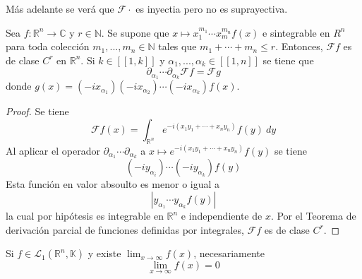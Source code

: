 \documentclass[12pt]{report}
\theoremstyle{largebreak}
\renewcommand{\leq}{\ensuremath{\leqslant}}
\newcommand\abs[1]{\ensuremath{\left|#1\right|}}
\newcommand\cf[3]{\ensuremath{#1:#2\rightarrow#3}}
\newcommand{\natint}[1]{\ensuremath{\left[\!\left[#1\right]\!\right]}}
\newcommand{\fou}[1]{\ensuremath{\mathcal{F}#1}}
\begin{document}
    \begin{obs}
        Más adelante se verá que $\fou{\cdot}$ es inyectia pero no es suprayectiva.
    \end{obs}

    \begin{propo}
        Sea $\cf{f}{\mathbb{R}^n}{\mathbb{C}}$ y $r\in\mathbb{N}$. Se supone que $x\mapsto x_1^{m_1}\cdots x_m^{m_n}f(x)$ e sintegrable en $R^n$ para toda colección $m_1,...,m_n\in\mathbb{N}$ tales que $m_1+\cdots+m_n\leq r$. Entonces, $\fou{f}$ es de clase $C^r$ en $\mathbb{R}^n$. Si $k\in\natint{1,k}$ y $\alpha_1,...,\alpha_k\in\natint{1,n}$ se tiene que
        \begin{equation*}
            \partial_{\alpha_1}\cdots\partial_{\alpha_k}\fou{f}=\fou{g}
        \end{equation*}
        donde $g(x)=(-ix_{\alpha_1})(-ix_{\alpha_2})\cdots(-ix_{\alpha_k})f(x)$.
    \end{propo}

    \begin{proof}
        Se tiene
        \begin{equation*}
            \fou{f}(x)=\int_{\mathbb{R}^n}e^{ -i(x_1y_1+\cdots+x_ny_n)}f(y)\:dy
        \end{equation*}
        Al aplicar el operador $\partial_{\alpha_1}\cdots\partial_{\alpha_k}$ a $x\mapsto e^{ -i(x_1y_1+\cdots+x_ny_n)}f(y)$ se tiene
        \begin{equation*}
            (-iy_{\alpha_i})\cdots(-iy_{\alpha_k})f(y)
        \end{equation*}
        Esta función en valor absoulto es menor o igual a
        \begin{equation*}
            \abs{y_{\alpha_1}\cdots y_{\alpha_k}f(y)}
        \end{equation*}
        la cual por hipótesis es integrable en $\mathbb{R}^n$ e independiente de $x$. Por el Teorema de derivación parcial de funciones definidas por integrales, $\fou{f}$ es de clase $C^r$.
    \end{proof}

    \begin{obs}
        Si $f\in\mathcal{L}_1(\mathbb{R}^n,\mathbb{K})$ y existe $\lim_{x\rightarrow\infty}f(x)$, necesariamente
        \begin{equation*}
            \lim_{x\rightarrow\infty}f(x)=0
        \end{equation*}
    \end{obs}
\end{document}
